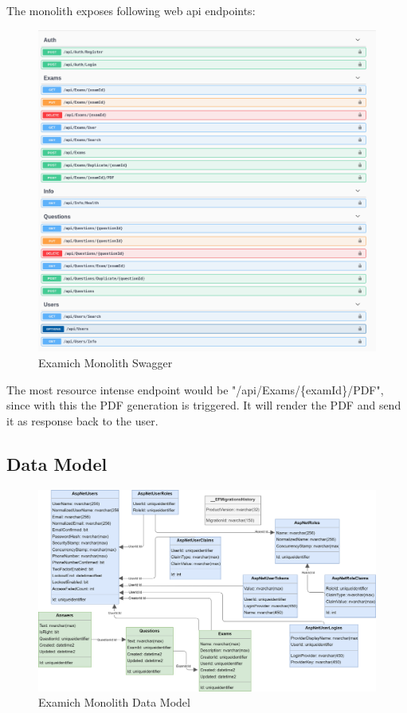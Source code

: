\documentclass[BIF,Bachelor,nenglish]{twbook}%
\begin{document}
The monolith exposes following web api endpoints:
\begin{figure} [H]
 \begin{center}
    \includegraphics[width=0.8\linewidth]{img/Monolith_Swagger.png}
 \end{center}
 \caption{Examich Monolith Swagger}
 \label{examichMonolithSwagger}
\end{figure}
\noindent
The most resource intense endpoint would be "/api/Exams/\{examId\}/PDF", since with this the PDF generation is triggered. It will render the PDF and send it as response back to the user.


\subsection{Data Model}

\begin{figure} [H]
 \begin{center}
    \includegraphics[width=1.1\linewidth]{img/ExamichDataModel.png}
 \end{center}
 \caption{Examich Monolith Data Model}
 \label{datamodel}
\end{figure}
\end{document}
